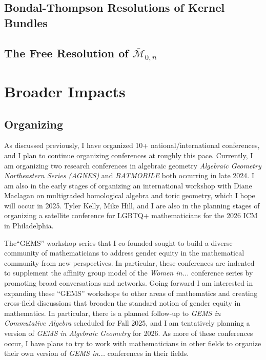 \documentclass[11pt,reqno]{amsart}
\theoremstyle{remark}
\newcommand{\cM}{\mathcal{M}}
\begin{document}
 \subsection{Bondal-Thompson Resolutions of Kernel Bundles}

\subsection{The Free Resolution of $\overline{\cM}_{0,n}$}



\section{Broader Impacts}\label{sec:broader-impacts} 

\subsection{Organizing} As discussed previously, I have organized 10+ national/international conferences, and I plan to continue organizing conferences at roughly this pace. Currently, I am organizing two research conferences in algebraic geometry \textit{Algebraic Geometry Northeastern Series (AGNES)} and \textit{BATMOBILE} both occurring in late 2024. I am also in the early stages of organizing an international workshop with Diane Maclagan on multigraded homological algebra and toric geometry, which I hope will occur in 2025. Tyler Kelly, Mike Hill, and I are also in the planning stages of organizing a satellite conference for LGBTQ+ mathematicians for the 2026 ICM in Philadelphia. 


The``GEMS'' workshop series that I co-founded sought to build a diverse community of mathematicians to address gender equity in the mathematical community from new perspectives. In particular, these conferences are indented to supplement the affinity group model of the \textit{Women in...} conference series by promoting broad conversations and networks. Going forward I am interested in expanding these ``GEMS'' workshops to other areas of mathematics and creating cross-field discussions that broaden the standard notion of gender equity in mathematics. In particular, there is a planned follow-up to \textit{GEMS in Commutative Algebra} scheduled for Fall 2025, and I am tentatively planning a version of \textit{GEMS in Algebraic Geometry} for 2026. As more of these conferences occur, I have plans to try to work with mathematicians in other fields to organize their own version of \textit{GEMS in...} conferences in their fields. 
\end{document}
